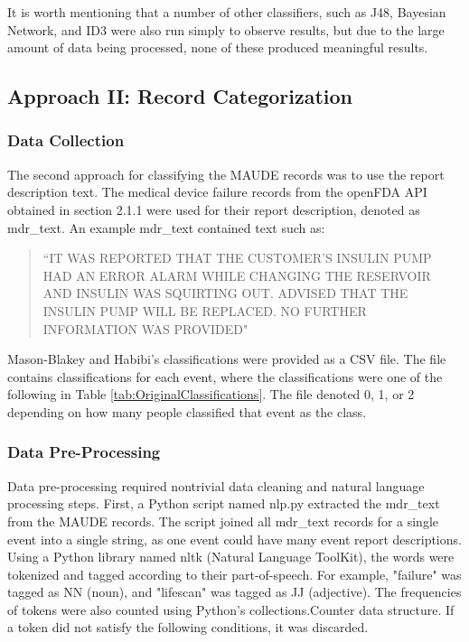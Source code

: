 \documentclass[11pt, notitlepage,abstracton,oneside]{article}   	%
\begin{document}
It is worth mentioning that a number of other classifiers, such as J48, Bayesian Network, and ID3 were also run simply to observe results, but due to the large amount of data being processed, none of these produced meaningful results. 

\subsection{Approach II: Record Categorization}
\subsubsection{Data Collection}
The second approach for classifying the MAUDE records was to use the report description text. The medical device failure records from the openFDA API obtained in section 2.1.1 were used for their report description, denoted as mdr\_text. An example mdr\_text contained text such as:

\begin{quote}
``IT WAS REPORTED THAT THE CUSTOMER'S INSULIN PUMP HAD AN ERROR ALARM WHILE CHANGING THE RESERVOIR AND INSULIN WAS SQUIRTING OUT. ADVISED THAT THE INSULIN PUMP WILL BE REPLACED. NO FURTHER INFORMATION WAS PROVIDED"
\end{quote}

Mason-Blakey and Habibi's classifications were provided as a CSV file. The file contains classifications for each event, where the classifications were one of the following in Table \ref{tab:OriginalClassifications}. The file denoted 0, 1, or 2 depending on how many people classified that event as the class.

\subsubsection{Data Pre-Processing}
Data pre-processing required nontrivial data cleaning and natural language processing steps. First, a Python script named nlp.py extracted the mdr\_text from the MAUDE records. The script joined all mdr\_text records for a single event into a single string, as one event could have many event report descriptions. Using a Python library named nltk (Natural Language ToolKit), the words were tokenized and tagged according to their part-of-speech. For example, "failure" was tagged as NN (noun), and "lifescan" was tagged as JJ (adjective). The frequencies of tokens were also counted using Python's collections.Counter data structure. If a token did not satisfy the following conditions, it was discarded.
\end{document}
